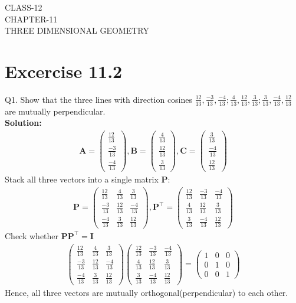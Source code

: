 \documentclass[12pt]{article}
\newcommand{\solution}{\noindent \textbf{Solution: }}
\newcommand{\myvec}[1]{\ensuremath{\begin{pmatrix}#1\end{pmatrix}}}
\let\vec\mathbf
\begin{document}
\begin{center}
\textbf\large{CLASS-12 \\ CHAPTER-11 \\ THREE DIMENSIONAL GEOMETRY}
\end{center}
\section*{Excercise 11.2}

Q1. Show that the three lines with direction cosines $\frac{12}{13}, \frac{-3}{13}, \frac{-4}{13}; \frac{4}{13}, \frac{12}{13}, \frac{3}{13}; \frac{3}{13}, \frac{-4}{13}, \frac{12}{13}$ are mutually perpendicular.
\\
\solution
		\begin{align}
			\vec{A}=\myvec{\frac{12}{13}\\[2pt]\frac{-3}{13}\\[2pt]\frac{-4}{13}},\vec{B}=\myvec{\frac{4}{13}\\[2pt]\frac{12}{13}\\[2pt]\frac{3}{13}},\vec{C}=\myvec{\frac{3}{13}\\[2pt]\frac{-4}{13}\\[2pt]\frac{12}{13}}
		\end{align}
			Stack all three vectors into a single matrix $\vec{P}$:
			\begin{align}
				\vec{P}=\myvec{\frac{12}{13}&\frac{4}{13}    &\frac{3}{13}\\[2pt] \frac{-3}{13}&\frac{12}{13}&\frac{-4}{13}\\[2pt] \frac{-4}{13}&\frac{3}{13}&\frac{12}{13}}, \vec{P}^\top=\myvec{\frac{12}{13}&\frac{-3}{13}   &\frac{-4}{13}\\[2pt] \frac{4}{13}&\frac{12}{13}&\frac{3}{13}\\[2pt] \frac{3}{13}&\frac{-4}{13}&\frac{12}{13}}
			\end{align}
Check whether $\vec{P}\vec{P}^\top=\vec{I}$
		\begin{align}
			\myvec{\frac{12}{13}&\frac{4}{13}    &\frac{3}{13}\\[2pt] \frac{-3}{13}&\frac{12}{13}&\frac{-4}{13}\\[2pt] \frac{-4}{13}&\frac{3}{13}&\frac{12}{13}}\myvec{\frac{12}{13}&\frac{-3}{13}   &\frac{-4}{13}\\[2pt] \frac{4}{13}&\frac{12}{13}&\frac{3}{13}\\[2pt] \frac{3}{13}&\frac{-4}{13}&\frac{12}{13}}=\myvec{1&0&0\\[2pt]0&1&0\\[2pt]0&0&1}
		\end{align}
		Hence, all three vectors are mutually orthogonal(perpendicular) to each other.
\end{document}
